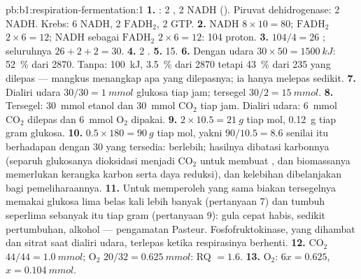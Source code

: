\begin{solution}{pb:b1:respiration-fermentation:1}
\textbf{1.} : 2 , 2 NADH (). Piruvat
dehidrogenase: 2 NADH. Krebs: 6 NADH, 2 $\mathrm{FADH_2}$, 2 GTP.
\textbf{2.} NADH  $8\times 10 = 80$; $\mathrm{FADH_2}$
$2\times 6 = 12$; NADH  sebagai $\mathrm{FADH_2}$ $2\times 6 = 12$:
104 proton.
\textbf{3.} $104/4 = 26$ ; seluruhnya $26 + 2 + 2 = 30$.
\textbf{4.} 2 .
\textbf{5.} 15.
\textbf{6.} Dengan udara $30\times 50 = \qty{1500}{kJ}$: \qty{52}{\%}
dari 2870. Tanpa: \qty{100}{kJ}, \qty{3.5}{\%} dari 2870 tetapi
\qty{43}{\%} dari 235 yang dilepas ---  mangkus menangkap apa
yang dilepasnya; ia hanya melepas sedikit.
\textbf{7.} Dialiri udara $30/30 = \qty{1}{mmol}$ glukosa tiap jam;
tersegel
$30/2 = \qty{15}{mmol}$.
\textbf{8.} Tersegel: \qty{30}{mmol} etanol dan \qty{30}{mmol}
$\mathrm{CO_2}$ tiap jam. Dialiri udara: \qty{6}{mmol}
$\mathrm{CO_2}$ dilepas dan \qty{6}{mmol} $\mathrm{O_2}$ dipakai.
\textbf{9.} $2\times 10.5 = \qty{21}{g}$ tiap mol, \qty{0.12}{g} tiap
gram glukosa.
\textbf{10.} $0.5\times 180 = \qty{90}{g}$ tiap mol, yakni $90/10.5 =
8.6$  senilai itu berhadapan dengan 30 yang tersedia: 
berlebih; hasilnya dibatasi karbonnya (separuh glukosanya dioksidasi
menjadi $\mathrm{CO_2}$ untuk membuat , dan biomassanya
memerlukan kerangka karbon serta daya reduksi), dan kelebihan 
dibelanjakan bagi pemeliharaannya.
\textbf{11.} Untuk memperoleh  yang sama biakan tersegelnya memakai
glukosa lima belas kali lebih banyak (pertanyaan 7) dan tumbuh
seperlima sebanyak itu tiap gram (pertanyaan 9): gula cepat habis,
sedikit pertumbuhan, alkohol --- pengamatan Pasteur. Fosfofruktokinase,
yang dihambat  dan sitrat saat dialiri udara, terlepas ketika
respirasinya berhenti.
\textbf{12.} $\mathrm{CO_2}$ $44/44 = \qty{1.0}{mmol}$; $\mathrm{O_2}$
$20/32 = \qty{0.625}{mmol}$: RQ $= 1.6$.
\textbf{13.} $\mathrm{O_2}$: $6x = 0.625$, $x = \qty{0.104}{mmol}$.

\end{solution}
